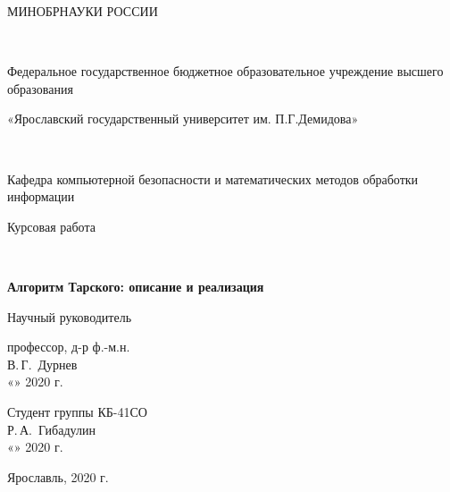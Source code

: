 \begin{titlepage}
    \begin{center}
        {\large МИНОБРНАУКИ РОССИИ
            
            ~
            
            Федеральное государственное бюджетное образовательное учреждение высшего образования
                
            «Ярославский государственный университет им. П.Г.Демидова»
            
            ~
            
            Кафедра компьютерной безопасности и
            математических методов обработки информации}
        \vfill
        
        {\large Курсовая работа}
        
        ~
        
        \textbf{{\large Алгоритм Тарского: описание и реализация}}
    \end{center}
    \vfill
    
    \newlength{\ML}
    \hfill\begin{minipage}{0.4\textwidth}
        Научный руководитель
        
        профессор, д-р ф.-м.н.
        \\
        \underline{\hspace{\ML}} В.\,Г.~Дурнев\\
        «\underline{\hspace{0.7cm}}» \underline{\hspace{2cm}} 2020 г.
    \end{minipage}%
    \bigskip
    
    \hfill\begin{minipage}{0.4\textwidth}
        Студент группы КБ-41СО
        \\
        \underline{\hspace{\ML}} Р.\,А.~Гибадулин\\
        «\underline{\hspace{0.7cm}}» \underline{\hspace{2cm}} 2020 г.
    \end{minipage}%
    \vfill
    
    \begin{center}
        Ярославль, 2020 г.
    \end{center}
\end{titlepage}